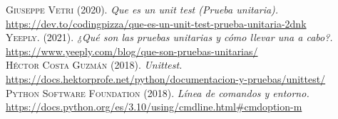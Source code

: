 \documentclass[conference]{IEEEtran}
\begin{document}
\normalsize

\begin{thebibliography}{}


 \textsc{Giuseppe Vetri} (2020). \textit{Que es un unit test (Prueba unitaria).} \url{https://dev.to/codingpizza/que-es-un-unit-test-prueba-unitaria-2dnk}\\

 \textsc{Yeeply.} (2021). \textit{¿Qué son las pruebas unitarias y cómo llevar una a cabo?.} \url{https://www.yeeply.com/blog/que-son-pruebas-unitarias/} \\

 \textsc{Héctor Costa Guzmán} (2018). \textit{Unittest.} \url{https://docs.hektorprofe.net/python/documentacion-y-pruebas/unittest/} \\

 \textsc{Python Software Foundation} (2018). \textit{Línea de comandos y entorno.} \url{https://docs.python.org/es/3.10/using/cmdline.html#cmdoption-m} \\



\end{thebibliography}
\end{document}
